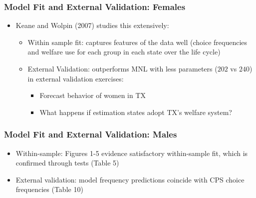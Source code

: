\begin{frame}
	\frametitle{Model Fit and External Validation: Females}
		\begin{itemize}
			\item Keane and Wolpin (2007) studies this  extensively:
				\begin{itemize}
					\item Within sample fit: captures features of the data well (choice frequencies and welfare use for each group in each state over the life cycle)
					\item External Validation: outperforms MNL with less parameters ($202$ vs $240$) in external validation exercises: 
					\begin{itemize}
						\item Forecast behavior of women in TX
						\item What happens if estimation states adopt TX's welfare system?
					\end{itemize}
				\end{itemize}
		\end{itemize}				
\end{frame}

\begin{frame}
	\frametitle{Model Fit and External Validation: Males}
		\begin{itemize}
			\item Within-sample: Figures 1-5 evidence satisfactory within-sample fit, which is confirmed through tests (Table 5)
			\item External validation: model frequency predictions coincide with CPS choice frequencies (Table 10)
		\end{itemize}
\end{frame}


